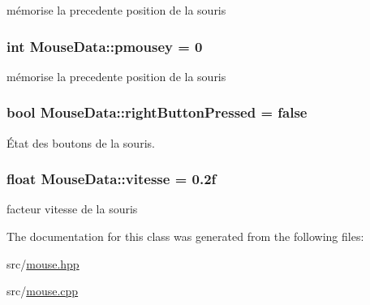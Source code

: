 mémorise la precedente position de la souris 

\subsubsection[{\texorpdfstring{pmousey}{pmousey}}]{\setlength{\rightskip}{0pt plus 5cm}int Mouse\+Data\+::pmousey = 0\hspace{0.3cm}{\ttfamily [static]}}\hypertarget{class_mouse_data_a35be8fdf24f27e0de5ba01e44bd6eb33}{}\label{class_mouse_data_a35be8fdf24f27e0de5ba01e44bd6eb33}


mémorise la precedente position de la souris 

\subsubsection[{\texorpdfstring{right\+Button\+Pressed}{rightButtonPressed}}]{\setlength{\rightskip}{0pt plus 5cm}bool Mouse\+Data\+::right\+Button\+Pressed = false\hspace{0.3cm}{\ttfamily [static]}}\hypertarget{class_mouse_data_a224b54f7b421bdb8443133db38c1ae4b}{}\label{class_mouse_data_a224b54f7b421bdb8443133db38c1ae4b}


État des boutons de la souris. 

\subsubsection[{\texorpdfstring{vitesse}{vitesse}}]{\setlength{\rightskip}{0pt plus 5cm}float Mouse\+Data\+::vitesse = 0.\+2f\hspace{0.3cm}{\ttfamily [static]}}\hypertarget{class_mouse_data_a86d3b28c7d10597467bb0288e6863941}{}\label{class_mouse_data_a86d3b28c7d10597467bb0288e6863941}


facteur vitesse de la souris 



The documentation for this class was generated from the following files\+:\begin{DoxyCompactItemize}
\item 
src/\hyperlink{mouse_8hpp}{mouse.\+hpp}\item 
src/\hyperlink{mouse_8cpp}{mouse.\+cpp}\end{DoxyCompactItemize}
